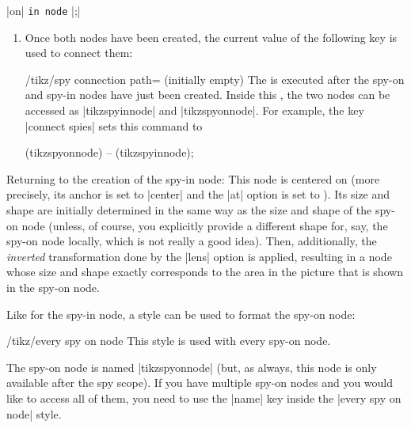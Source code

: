 \begin{command}{\spy {} |on|  \texttt{in node} |;|}
\begin{enumerate}
\begin{codeexample}[]
\end{codeexample}
        \item Once both nodes have been created, the current value of the
            following key is used to connect them:
            \begin{key}{/tikz/spy connection path= (initially \normalfont empty)}
                The  is executed after the spy-on and spy-in nodes
                have just been created. Inside this , the two nodes
                can be accessed as |tikzspyinnode| and  |tikzspyonnode|. For
                example, the key |connect spies| sets this command to
\begin{codeexample}
\draw[thin] (tikzspyonnode) -- (tikzspyinnode);
\end{codeexample}
            \end{key}
    \end{enumerate}
    Returning to the creation of the spy-in node: This node is centered on
     (more precisely, its anchor is set to |center| and the
    |at| option is set to ). Its size and shape are initially
    determined in the same way as the size and shape of the spy-on node
    (unless, of course, you explicitly provide a different shape for, say, the
    spy-on node locally, which is not really a good idea). Then, additionally,
    the \emph{inverted} transformation done by the |lens| option is applied,
    resulting in a node whose size and shape exactly corresponds to the area in
    the picture that is shown in the spy-on node.
\begin{codeexample}[]
\end{codeexample}

    Like for the spy-in node, a style can be used to format the spy-on node:
    \begin{stylekey}{/tikz/every spy on node}
        This style is used with every spy-on node.
    \end{stylekey}
    The spy-on node is named |tikzspyonnode| (but, as always, this node is only
    available after the spy scope). If you have multiple spy-on nodes and you
    would like to access all of them, you need to use the |name| key inside the
    |every spy on node| style.


\end{command}
